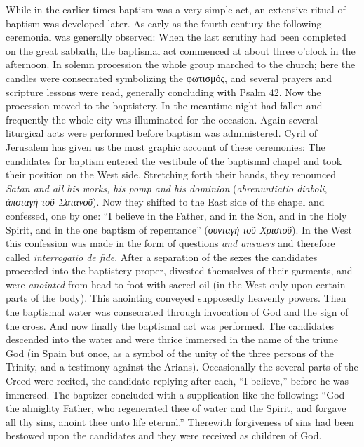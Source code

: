 While in the earlier times baptism was a very simple act, an extensive ritual of baptism was developed later. As early as the fourth century the following ceremonial was generally observed: When the last scrutiny had been completed on the great sabbath, the baptismal act commenced at about three o’clock in the afternoon. In solemn procession the whole group marched to the church; here the candles were consecrated symbolizing the φωτισμός, and several prayers and scripture lessons were read, generally concluding with Psalm 42. Now the procession moved to the baptistery. In the meantime night had fallen and frequently the whole
city was illuminated for the occasion. Again several liturgical acts were performed before baptism was administered. Cyril of Jerusalem has given us the most graphic account of these ceremonies: The candidates for baptism entered the vestibule of the baptismal chapel and took their position on the West side. Stretching forth their hands, they renounced \emph{Satan and all his works, his pomp and his dominion} (\emph{abrenuntiatio diaboli}, \emph{ἀποταγὴ τοῦ Σατανοῦ}). Now they shifted to the East side of the chapel and confessed, one by one: “I believe in the Father, and in the Son, and in the Holy Spirit, and in the one baptism of repentance” (\emph{συνταγὴ τοῦ Χριστοῦ}). In the West this confession was made in the form of questions \emph{and answers} and therefore called \emph{interrogatio de fide}. After a separation of the sexes the candidates proceeded into the baptistery proper, divested themselves of their garments, and were \emph{anointed} from head to foot with sacred oil (in the West only upon certain parts of the body). This anointing conveyed supposedly heavenly powers. Then the baptismal water was consecrated through invocation of God and the sign of the cross. And now finally the baptismal act was performed. The candidates descended into the water and were thrice immersed in the name of the triune God (in Spain but once, as a symbol of the unity of the three persons of the Trinity, and a testimony against the Arians). Occasionally the several parts of the Creed were recited, the candidate replying after each, “I believe,” before he was immersed. The baptizer concluded with a supplication like the following: “God the almighty Father, who regenerated thee of water and the Spirit, and forgave all thy sins, anoint thee unto life eternal.” Therewith forgiveness of sins had been bestowed upon the candidates and they were received as children of God.

